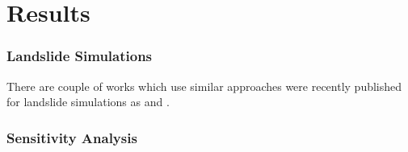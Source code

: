\chapter{Results} \label{chap:results}

\subsection{Landslide Simulations}
There are couple of works which use similar approaches were recently published for landslide simulations as \cite{nan2023high} and \cite{shen2022resolved}.
\subsection{Sensitivity Analysis}






